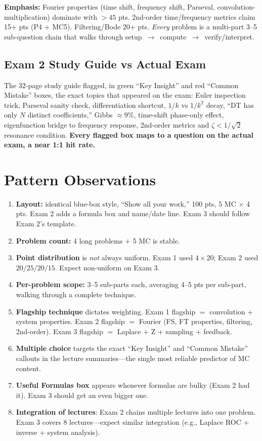 \documentclass[11pt]{article}
\begin{document}
\noindent\textbf{Emphasis:} Fourier properties (time shift, frequency shift, Parseval, convolution-multiplication) dominate with $>\!45$ pts. 2nd-order time/frequency metrics claim 15+ pts (P4 + MC5). Filtering/Bode 20+ pts. \emph{Every} problem is a multi-part 3--5 sub-question chain that walks through setup~$\to$~compute~$\to$~verify/interpret.

\subsection*{Exam 2 Study Guide vs Actual Exam}
The 32-page study guide flagged, in green ``Key Insight'' and red ``Common Mistake'' boxes, the exact topics that appeared on the exam: Euler inspection trick, Parseval sanity check, differentiation shortcut, $1/k$ vs $1/k^2$ decay, ``DT has only $N$ distinct coefficients,'' Gibbs $\approx 9\%$, time-shift phase-only effect, eigenfunction bridge to frequency response, 2nd-order metrics and $\zeta<1/\sqrt{2}$ resonance condition. \textbf{Every flagged box maps to a question on the actual exam, a near 1:1 hit rate.}

\section{Pattern Observations}

\begin{enumerate}[leftmargin=*]
    \item \textbf{Layout:} identical blue-box style, ``Show all your work,'' 100 pts, 5 MC $\times$ 4 pts. Exam 2 adds a formula box and name/date line. Exam 3 should follow Exam 2's template.
    \item \textbf{Problem count:} 4 long problems $+$ 5 MC is stable.
    \item \textbf{Point distribution} is \emph{not} always uniform. Exam 1 used $4\times 20$; Exam 2 used $20/25/20/15$. Expect non-uniform on Exam 3.
    \item \textbf{Per-problem scope:} 3--5 sub-parts each, averaging 4--5 pts per sub-part, walking through a complete technique.
    \item \textbf{Flagship technique} dictates weighting. Exam 1 flagship $=$ convolution + system properties. Exam 2 flagship $=$ Fourier (FS, FT properties, filtering, 2nd-order). Exam 3 flagship $=$ Laplace + Z + sampling + feedback.
    \item \textbf{Multiple choice} targets the exact ``Key Insight'' and ``Common Mistake'' callouts in the lecture summaries---the single most reliable predictor of MC content.
    \item \textbf{Useful Formulas box} appears whenever formulas are bulky (Exam 2 had it). Exam 3 should get an even bigger one.
    \item \textbf{Integration of lectures}: Exam 2 chains multiple lectures into one problem. Exam 3 covers 8 lectures---expect similar integration (e.g., Laplace ROC + inverse + system analysis).
\end{enumerate}
\end{document}
